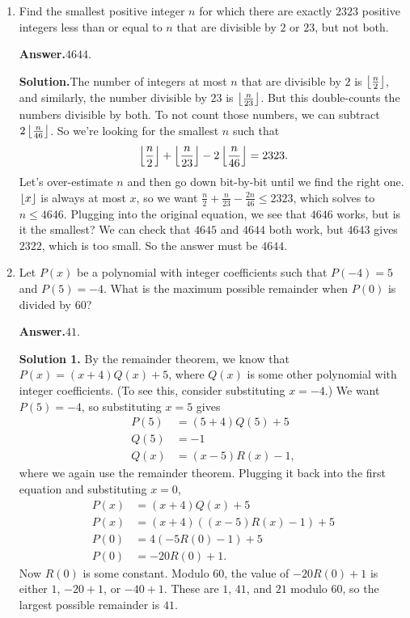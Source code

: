 \documentclass[11pt,paper=letter]{scrartcl}
\newcommand{\ans}[1]{{\sffamily \bfseries Answer.}\;\(\boxed{\text{#1}}\).}
\newcommand{\sol}{{\sffamily \bfseries Solution.}\;}
\newcommand{\soln}[1]{{\sffamily \bfseries Solution #1.}\;}
\begin{document}
\begin{enumerate}[align=left,leftmargin=*,resume]
The graph changes direction thrice, at $x = -2, -\frac{1}{2}$, and $2$. We can compute the $y$ values at these points as $10, \frac{49}{4}, 6$. Using this information, we can sketch what the graph would look like, and determine that the $y$ that produce three solutions are $10$ and $\frac{49}{4}$. Their sum is $\frac{89}{4}$, so the answer is $89 + 4 = 93$.

\item Find the smallest positive integer $n$ for which there are exactly $2323$ positive integers less than or equal to $n$ that are divisible by $2$ or $23$, but not both.

\ans{$4644$}

\sol The number of integers at most $n$ that are divisible by $2$ is $\left\lfloor \frac{n}{2} \right\rfloor$, and similarly, the number divisible by $23$ is $\left\lfloor \frac{n}{23} \right\rfloor$. But this double-counts the numbers divisible by both. To not count those numbers, we can subtract $2\left\lfloor \frac{n}{46} \right\rfloor$. So we're looking for the smallest $n$ such that \[
  \left\lfloor \frac{n}{2} \right\rfloor + \left\lfloor \frac{n}{23} \right\rfloor - 2\left\lfloor \frac{n}{46} \right\rfloor = 2323.
\]
Let's over-estimate $n$ and then go down bit-by-bit until we find the right one. $\left\lfloor x \right\rfloor$ is always at most $x$, so we want $\frac{n}{2} + \frac{n}{23} - \frac{2n}{46} \le 2323$, which solves to $n \le 4646$. Plugging into the original equation, we see that $4646$ works, but is it the smallest? We can check that $4645$ and $4644$ both work, but $4643$ gives $2322$, which is too small. So the answer must be $4644$.

\item Let $P(x)$ be a polynomial with integer coefficients such that $P(-4) = 5$ and $P(5) = -4$. What is the maximum possible remainder when $P(0)$ is divided by $60$?

\ans{$41$}

\soln1 By the remainder theorem, we know that $P(x) = (x + 4)Q(x) + 5$, where $Q(x)$ is some other polynomial with integer coefficients. (To see this, consider substituting $x = -4$.) We want $P(5) = -4$, so substituting $x = 5$ gives 
\begin{align*}
P(5) &= (5 + 4)Q(5) + 5 \\
Q(5) &= -1 \\
Q(x) &= (x - 5)R(x) - 1,
\end{align*}
where we again use the remainder theorem. Plugging it back into the first equation and substituting $x = 0$,
\begin{align*}
P(x) &= (x + 4)Q(x) + 5 \\
P(x) &= (x + 4)\left( (x - 5)R(x) - 1 \right) + 5 \\
P(0) &= 4\left(-5R(0)-1\right) + 5 \\
P(0) &= -20R(0)+1.
\end{align*}
Now $R(0)$ is some constant. Modulo $60$, the value of $-20R(0) + 1$ is either $1$, $-20 + 1$, or $-40 + 1$. These are $1$, $41$, and $21$ modulo $60$, so the largest possible remainder is $41$.


\end{enumerate}
\end{document}
